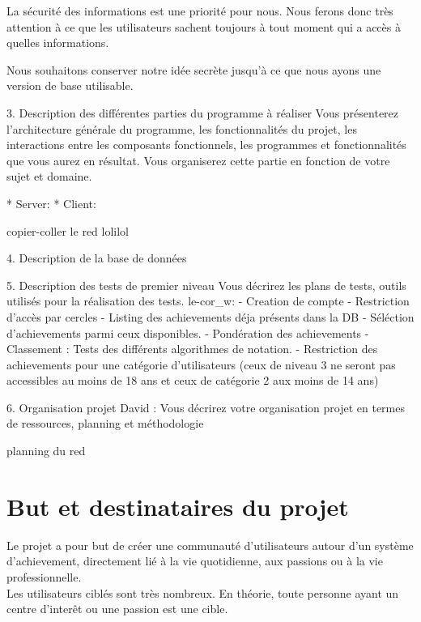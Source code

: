 \documentclass{life-fr}
\begin{document}
La sécurité des informations est une priorité pour nous. Nous ferons donc très attention à ce que les utilisateurs sachent toujours à tout moment qui a accès à quelles informations.

Nous souhaitons conserver notre idée secrète jusqu’à ce que nous ayons une version de base utilisable.

3. Description des différentes parties du programme à réaliser
Vous présenterez l’architecture générale du programme, les fonctionnalités du projet, les interactions
entre les composants fonctionnels, les programmes et fonctionnalités que vous aurez en résultat. Vous
organiserez cette partie en fonction de votre sujet et domaine.

* Server:
* Client:

copier-coller le red lolilol












4. Description de la base de données

5. Description des tests de premier niveau
Vous décrirez les plans de tests, outils utilisés pour la réalisation des tests.
le-cor_w:
- Creation de compte
- Restriction d’accès par cercles
- Listing des achievements déja présents dans la DB
- Séléction d’achievements parmi ceux disponibles.
- Pondération des achievements
- Classement : Tests des différents algorithmes de notation.
- Restriction des achievements pour une catégorie d’utilisateurs (ceux de niveau 3 ne seront pas accessibles au moins de 18 ans et ceux de catégorie 2 aux moins de 14 ans)

6. Organisation projet
David :
Vous décrirez votre organisation projet en termes de ressources, planning et méthodologie

planning du red



\chapter{But et destinataires du projet}

Le projet a pour but de créer une communauté d'utilisateurs autour d'un système d'achievement, directement lié à la vie quotidienne, aux passions ou à la vie professionnelle.\\

Les utilisateurs ciblés sont très nombreux. En théorie, toute personne ayant un centre d'interêt ou une passion est une cible.\\
\end{document}
